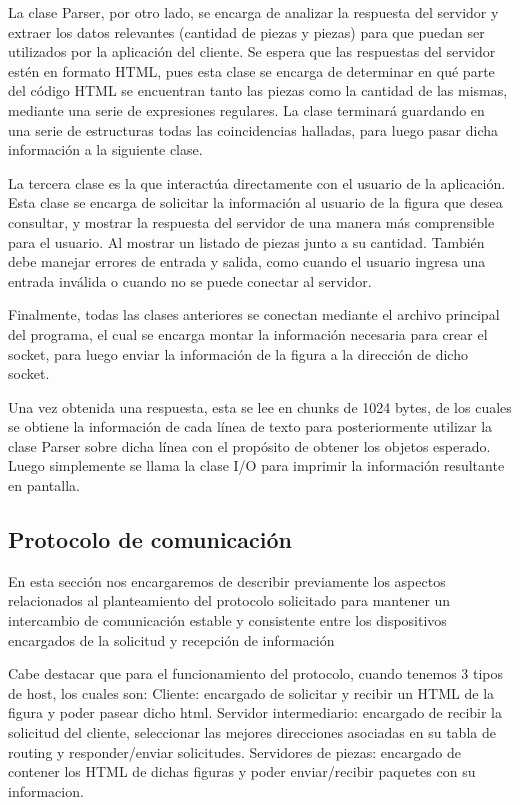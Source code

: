 \documentclass[a4paper,10pt]{article}
\begin{document}
	La clase Parser, por otro lado, se encarga de analizar la respuesta del servidor y extraer los datos relevantes (cantidad de piezas y piezas) para que puedan ser utilizados por la aplicación del cliente. Se espera que las respuestas del servidor estén en formato HTML, pues esta clase se encarga de determinar en qué parte del código HTML se encuentran tanto las piezas como la cantidad de las mismas, mediante una serie de expresiones regulares. La clase terminará guardando en una serie de estructuras todas las coincidencias halladas, para luego pasar dicha información a la siguiente clase.
 
	La tercera clase es la que interactúa directamente con el usuario de la aplicación. Esta clase se encarga de solicitar la información al usuario de la figura que desea consultar, y mostrar la respuesta del servidor de una manera más comprensible para el usuario. Al mostrar un listado de piezas junto a su cantidad.
	 También debe manejar errores de entrada y salida, como cuando el usuario ingresa una entrada inválida o cuando no se puede conectar al servidor.
 
	Finalmente, todas las clases anteriores se conectan mediante el archivo principal del programa, el cual se encarga montar la información necesaria para crear el socket, para luego enviar la información de la figura a la dirección de dicho socket.
 
	Una vez obtenida una respuesta, esta se lee en chunks de 1024 bytes, de los cuales se obtiene la información de cada línea de texto para posteriormente utilizar la clase Parser sobre dicha línea con el propósito de obtener los objetos esperado. Luego simplemente se llama la clase I/O para imprimir la información resultante en pantalla.

 	\subsection{Protocolo de comunicación}
	En esta sección nos encargaremos de describir previamente los aspectos relacionados al planteamiento del protocolo solicitado para mantener un intercambio de comunicación estable y consistente entre los dispositivos encargados de la solicitud y recepción de información

	Cabe destacar que para el funcionamiento del protocolo, cuando tenemos 3 tipos de host, los cuales son:
	Cliente: encargado de solicitar y recibir un HTML de la figura y poder pasear dicho html.
	Servidor intermediario: encargado de recibir la solicitud del cliente, seleccionar las mejores direcciones asociadas en su tabla de routing y responder/enviar solicitudes.
	Servidores de piezas: encargado de contener los HTML de dichas figuras y poder enviar/recibir paquetes con su informacion.
	
\end{document}
